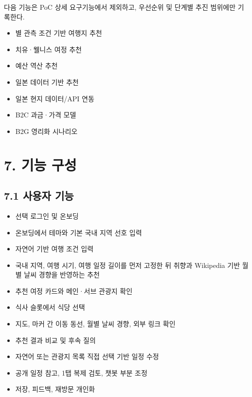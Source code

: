 \documentclass[12pt,a4paper]{article}
\newcommand{\DocNeedspace}[1]{\par\ifdim\dimexpr\pagegoal-\pagetotal\relax<#1\newpage\fi}
\begin{document}
\DocNeedspace{3\baselineskip}
다음 기능은 PoC 상세 요구기능에서 제외하고, 우선순위 및 단계별 추진 범위에만 기록한다.


\begin{itemize}
\item 별 관측 조건 기반 여행지 추천
\item 치유·웰니스 여정 추천
\item 예산 역산 추천
\item 일본 데이터 기반 추천
\item 일본 현지 데이터/API 연동
\item B2C 과금·가격 모델
\item B2G 영리화 시나리오
\end{itemize}


\newpage

\DocNeedspace{10\baselineskip}
\section*{7. 기능 구성}


\DocNeedspace{8\baselineskip}
\subsection*{7.1 사용자 기능}


\begin{itemize}
\item 선택 로그인 및 온보딩
\item 온보딩에서 테마와 기본 국내 지역 선호 입력
\item 자연어 기반 여행 조건 입력
\item 국내 지역, 여행 시기, 여행 일정 길이를 먼저 고정한 뒤 취향과 Wikipedia 기반 월별 날씨 경향을 반영하는 추천
\item 추천 여정 카드와 메인·서브 관광지 확인
\item 식사 슬롯에서 식당 선택
\item 지도, 마커 간 이동 동선, 월별 날씨 경향, 외부 링크 확인
\item 추천 결과 비교 및 후속 질의
\item 자연어 또는 관광지 목록 직접 선택 기반 일정 수정
\item 공개 일정 참고, 1탭 복제 검토, 챗봇 부분 조정
\item 저장, 피드백, 재방문 개인화
\end{itemize}


\newpage
\end{document}
